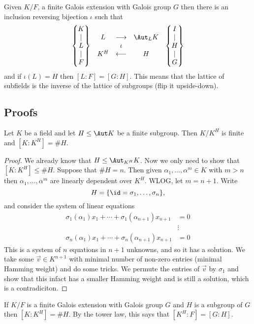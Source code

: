 \begin{theorem}
Given $K/F$, a finite Galois extension with Galois group $G$ then there is an inclusion reversing bijection $\iota$ such that
\[
	\begin{matrix}
	\left\{ \begin{matrix}
		K \\ \mid \\ L \\ \mid \\ F
	\end{matrix} \right\}
	 & 
	 \begin{matrix}
	 L & \longrightarrow & \Aut_L K \\ & \iota & \\
	 K^H & \longleftarrow & H
	 \end{matrix}
	 &
	 \left\{ \begin{matrix}
		I \\ \mid \\ H \\ \mid \\ G
	\end{matrix} \right\}
	\end{matrix}
\]
and if $\iota(L) = H$ then $[L : F] = [G : H]$. This means that the lattice of subfields is the inverse of the lattice of subgroups (flip it upside-down).
\end{theorem}

\subsection{Proofs}

\begin{theorem}
Let $K$ be a field and let $H \leq \Aut K$ be a finite subgroup. Then $K/K^H$ is finite and $[K : K^H] = \#H$.
\end{theorem}

\begin{proof}
We already know that $H \leq \Aut_{K^H} K$. Now we only need to show that $[K : K^H] \leq \#H$. Suppose that $\#H = n$. Then given $\alpha_1, \dotsc, \alpha^m \in K$ with $m > n$ then $\alpha_1, \dotsc, \alpha^m$ are linearly dependent over $K^H$. WLOG, let $m = n+1$. Write 
\[ H = \{\id = \sigma_1, \dotsc, \sigma_n\}, \]
and consider the system of linear equations 
\begin{align*}
	\sigma_1(\alpha_1)x_1 + \cdots + \sigma_1(\alpha_{n+1})x_{n+1} &= 0 \\
	&\vdots \\
	\sigma_n(\alpha_1)x_1 + \cdots + \sigma_n(\alpha_{n+1})x_{n+1} &= 0
\end{align*}
This is a system of $n$ equations in $n+1$ unknowns, and so it has a solution. We take some $\vec{v} \in K^{n+1}$ with minimal number of non-zero entries (minimal Hamming weight) and do some tricks. We permute the entries of $\vec{v}$ by $\sigma_1$ and show that this infact has a smaller Hamming weight and is still a solution, which is a contradiciton.
\end{proof}

\begin{corollary}
If $K/F$ is a finite Galois extension with Galois group $G$ and $H$ is a subgroup of $G$ then $[K : K^H] = \#H$. By the tower law, this says that $[K^H : F] = [G:H]$.
\end{corollary}